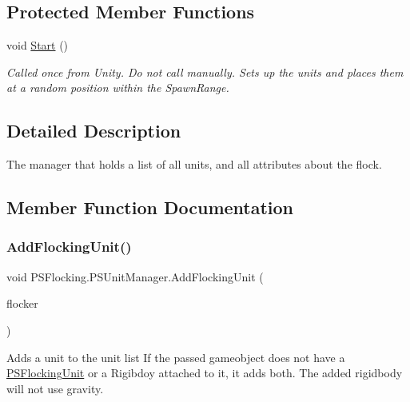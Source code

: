 \subsection*{Protected Member Functions}
\begin{DoxyCompactItemize}
\item 
\mbox{\label{class_p_s_flocking_1_1_p_s_unit_manager_a5ddc6c91220d066b472093428b21ee2b}} 
void \hyperlink{class_p_s_flocking_1_1_p_s_unit_manager_a5ddc6c91220d066b472093428b21ee2b}{Start} ()
\begin{DoxyCompactList}\small\item\em Called once from Unity. Do not call manually. Sets up the units and places them at a random position within the Spawn\+Range. \end{DoxyCompactList}\end{DoxyCompactItemize}


\subsection{Detailed Description}
The manager that holds a list of all units, and all attributes about the flock. 

\subsection{Member Function Documentation}
\mbox{\label{class_p_s_flocking_1_1_p_s_unit_manager_a7781ba028d37cfe03fd3c540869751aa}} 
\subsubsection{\texorpdfstring{Add\+Flocking\+Unit()}{AddFlockingUnit()}}
{\footnotesize\ttfamily void P\+S\+Flocking.\+P\+S\+Unit\+Manager.\+Add\+Flocking\+Unit (\begin{DoxyParamCaption}\item[{Game\+Object}]{flocker }\end{DoxyParamCaption})}



Adds a unit to the unit list If the passed gameobject does not have a \hyperlink{class_p_s_flocking_1_1_p_s_flocking_unit}{P\+S\+Flocking\+Unit} or a Rigibdoy attached to it, it adds both. The added rigidbody will not use gravity. 



